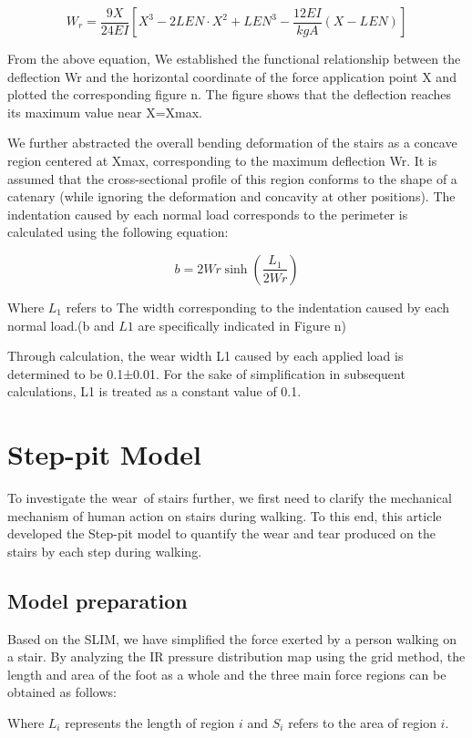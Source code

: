 \documentclass{mcmthesis}
\begin{document}
\[ W_r = \frac{9X}{24EI} \left[ X^3 - 2LEN \cdot X^2 + LEN^3 - \frac{12EI}{kgA}(X - LEN) \right] \]

From the above equation, We established the functional relationship between the deflection Wr and the horizontal coordinate of the force application point X and plotted the corresponding figure n. The figure shows that the deflection reaches its maximum value near X=Xmax.


We further abstracted the overall bending deformation of the stairs as a concave region centered at Xmax, corresponding to the maximum deflection Wr. It is assumed that the cross-sectional profile of this region conforms to the shape of a catenary (while ignoring the deformation and concavity at other positions). The indentation caused by each normal load corresponds to the perimeter is calculated using the following equation:

\[ b = 2Wr \sinh\left(\frac{L_1}{2Wr}\right) \]

Where $L_1$ refers to The width corresponding to the indentation caused by each normal load.(b and $L1$ are specifically indicated in Figure n)

Through calculation, the wear width L1 caused by each applied load is determined to be 0.1±0.01. For the sake of simplification in subsequent calculations, L1 is treated as a constant value of 0.1.

\section{Step-pit Model}
To investigate the wear of stairs further, we first need to clarify the mechanical mechanism of human action on stairs during walking. To this end, this article developed the Step-pit model
to quantify the wear and tear produced on the stairs by each step during walking.

\subsection{Model preparation}

Based on the SLIM, we have simplified the force exerted by a person walking on a stair. By analyzing the IR pressure distribution map using the grid method, the length and area of the foot as a whole and the three main force regions can be obtained as follows:




Where \(L_i\) represents the length of region \(i\) and \(S_i\) refers to the area of region \(i\).
\end{document}

